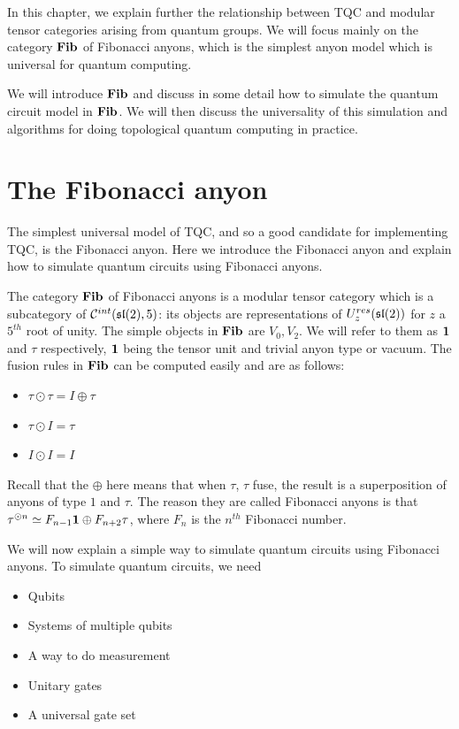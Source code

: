 In this chapter, we explain further the relationship between TQC and modular tensor
categories arising from quantum groups. We will focus mainly on the category
$\mathbf{Fib}$ of Fibonacci anyons, which is the simplest anyon model which is universal for
quantum computing. 

We will introduce $\mathbf{Fib}$ and discuss in some detail how to simulate the quantum
circuit model in $\mathbf{Fib}$. We will then discuss the universality of this
simulation and algorithms for doing topological quantum computing in practice.

\section{The Fibonacci anyon}
The simplest universal model of TQC, and so a good candidate for implementing
TQC, is the Fibonacci anyon. Here we introduce the Fibonacci anyon and explain
how to simulate quantum circuits using Fibonacci anyons.

The category $\mathbf{Fib}$ of Fibonacci anyons is a modular tensor category which is a
subcategory of $\mathcal{C}^{int}(\mathfrak{sl}(2),5)$: its objects are representations
of $U_z^{res}(\mathfrak{sl}(2))$ for $z$ a $5^{th}$ root of unity. The simple objects in 
$\mathbf{Fib}$ are $V_0, V_2$. We will refer to them as $\mathbf{1}$ and $\tau$
respectively, $\mathbf{1}$ being the tensor unit and trivial anyon type or vacuum. The
fusion rules in $\mathbf{Fib}$ can be computed easily and are as follows:

\begin{itemize}
    \item $\tau \odot \tau = I \oplus \tau$
    \item $\tau \odot I = \tau$
    \item $I \odot I = I$
\end{itemize}
Recall that the $\oplus$ here means that when $\tau$, $\tau$ fuse, the result
is a superposition of anyons of type $1$ and $\tau$.  The reason they are
called Fibonacci anyons is that $\tau^{\odot n} \simeq F_{n-1} \mathbf{1} \oplus F_{n+2}
\tau$, where $F_n$ is the $n^{th}$ Fibonacci number.

We will now explain a simple way to simulate quantum circuits using Fibonacci
anyons. To simulate quantum circuits, we need

\begin{itemize}
\item Qubits
\item Systems of multiple qubits
\item A way to do measurement
\item Unitary gates
\item A universal gate set
\end{itemize}

